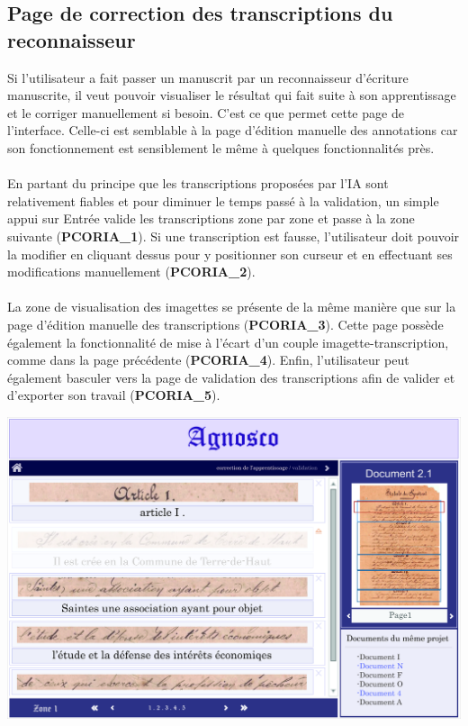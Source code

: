 \subsection{Page de correction des transcriptions du reconnaisseur}

Si l’utilisateur a fait passer un manuscrit par un reconnaisseur d’écriture
manuscrite, il veut pouvoir visualiser le résultat qui fait suite à son
apprentissage et le corriger manuellement si besoin. C’est ce que permet
cette page de l’interface. Celle-ci est semblable à la page d’édition manuelle
des annotations car son fonctionnement est sensiblement le même à quelques
fonctionnalités près.

\paragraph{}
En partant du principe que les transcriptions proposées par l’IA sont
relativement fiables et pour diminuer le temps passé à la validation, un simple
appui sur Entrée valide les transcriptions zone par zone et passe à la zone
suivante (\textbf{PCORIA\_1}). Si une transcription est fausse, l’utilisateur
doit pouvoir la modifier en cliquant dessus pour y positionner son curseur et
en effectuant ses modifications manuellement (\textbf{PCORIA\_2}).

\paragraph{}
La zone de visualisation des imagettes se présente de la même manière que sur
la page d’édition manuelle des transcriptions (\textbf{PCORIA\_3}). Cette page
possède également la fonctionnalité de mise à l’écart d’un couple
imagette-transcription, comme dans la page précédente (\textbf{PCORIA\_4}).
Enfin, l’utilisateur peut également basculer vers la page de validation des
transcriptions afin de valider et d’exporter son travail (\textbf{PCORIA\_5}).

\newpage

\begin{mdframed}[frametitle={Figure 9 : Correction de l'IA}, innerbottommargin=10]
\begin{center}
\includegraphics[scale=0.05]{ihm4.jpg}
\end{center}
\end{mdframed}

